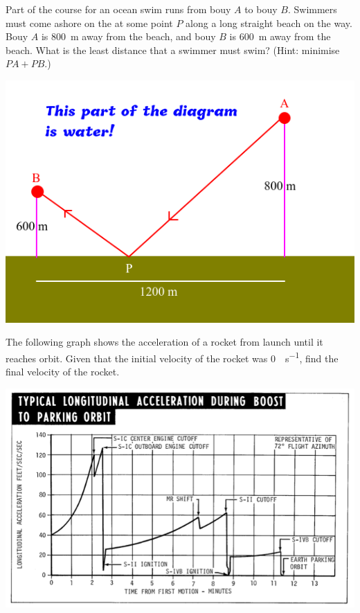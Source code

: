 \begin{questions}
  \question Part of the course for an ocean swim runs from bouy $ A $ to bouy $ B $. Swimmers must come ashore
            on the at some point $ P $ along a long straight beach on the way. Bouy $ A $ is \SI{800}{\metre} away
            from the beach, and bouy $ B $ is \SI{600}{\metre} away from the beach. What is the least distance that
            a swimmer must swim? (Hint: minimise $ PA + PB $.)
            \begin{center}
              \includegraphics[width=0.5\linewidth]{bouys}
            \end{center}
  \question The following graph shows the acceleration of a rocket from launch until it reaches orbit. Given that the
            initial velocity of the rocket was \SI{0}{\foot\per\second}, find the final velocity of the rocket.
            \begin{center}
              \includegraphics[width=0.7\linewidth]{acceleration-time}
            \end{center}
\end{questions}

